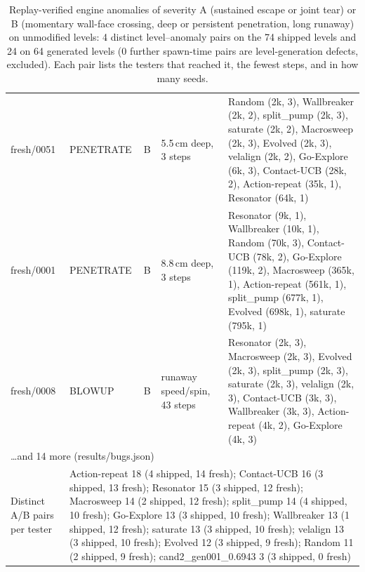 \begin{table}[t]
\begin{tabular}{llllp{5.6cm}}
fresh/0051 & PENETRATE & B & 5.5\,cm deep, 3 steps & Random (2k, 3), Wallbreaker (2k, 2), split\_pump (2k, 3), saturate (2k, 2), Macrosweep (2k, 3), Evolved (2k, 3), velalign (2k, 2), Go-Explore (6k, 3), Contact-UCB (28k, 2), Action-repeat (35k, 1), Resonator (64k, 1) \\
fresh/0001 & PENETRATE & B & 8.8\,cm deep, 3 steps & Resonator (9k, 1), Wallbreaker (10k, 1), Random (70k, 3), Contact-UCB (78k, 2), Go-Explore (119k, 2), Macrosweep (365k, 1), Action-repeat (561k, 1), split\_pump (677k, 1), Evolved (698k, 1), saturate (795k, 1) \\
fresh/0008 & BLOWUP & B & runaway speed/spin, 43 steps & Resonator (2k, 3), Macrosweep (2k, 3), Evolved (2k, 3), split\_pump (2k, 3), saturate (2k, 3), velalign (2k, 3), Contact-UCB (3k, 3), Wallbreaker (3k, 3), Action-repeat (4k, 2), Go-Explore (4k, 3) \\
\multicolumn{5}{l}{\ldots and 14 more (results/bugs.json)} \\
\midrule
Distinct A/B pairs per tester & \multicolumn{4}{l}{Action-repeat 18 (4 shipped, 14 fresh); Contact-UCB 16 (3 shipped, 13 fresh); Resonator 15 (3 shipped, 12 fresh); Macrosweep 14 (2 shipped, 12 fresh); split\_pump 14 (4 shipped, 10 fresh); Go-Explore 13 (3 shipped, 10 fresh); Wallbreaker 13 (1 shipped, 12 fresh); saturate 13 (3 shipped, 10 fresh); velalign 13 (3 shipped, 10 fresh); Evolved 12 (3 shipped, 9 fresh); Random 11 (2 shipped, 9 fresh); cand2\_gen001\_0.6943 3 (3 shipped, 0 fresh)} \\
\bottomrule
\end{tabular}
\caption{Replay-verified engine anomalies of severity A (sustained escape or joint tear) or B (momentary wall-face crossing, deep or persistent penetration, long runaway) on unmodified levels: 4 distinct level--anomaly pairs on the 74 shipped levels and 24 on 64 generated levels (0 further spawn-time pairs are level-generation defects, excluded). Each pair lists the testers that reached it, the fewest steps, and in how many seeds.}
\label{tab:bugs}
\end{table}
